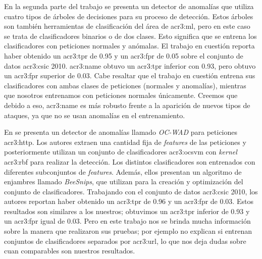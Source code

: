 En la segunda parte del trabajo
\citep{torranoGimenez2015study} %
se presenta un detector de anomalías que utiliza cuatro tipos de árboles
de decisiones para su proceso de detección. Estos árboles son también
herramientas de clasificación del área de \gls{acr3:ml}, pero en este
caso se trata de clasificadores binarios o de dos clases. Esto significa
que se entrena los clasificadores con peticiones normales y anómalas.
El trabajo en cuestión reporta haber obtenido un \gls{acr3:tpr} de \num{0.95}
y un \gls{acr3:fpr} de \num{0.05} sobre el conjunto de datos \gls{acr3:csic}
2010. \gls{acr3:name} obtuvo un \gls{acr3:tpr} inferior con \num{0.93},
pero obtuvo un \gls{acr3:fpr} superior de \num{0.03}.
Cabe resaltar que el trabajo en cuestión entrena sus clasificadores con
ambas clases de peticiones (normales y anomalías), mientras que nosotros
entrenamos con peticiones normales únicamente. Creemos que debido a eso,
\gls{acr3:name} es más robusto frente a la aparición de nuevos tipos de
ataques, ya que no se usan anomalías en el entrenamiento.

En \citep{parhizkar2015oc} %
se presenta un detector de anomalías llamado \textit{OC-WAD} para peticiones
\gls{acr3:http}. Los autores extraen una cantidad fija de \textit{features}
de las peticiones y posteriormente utilizan un conjunto de clasificadores
\gls{acr3:ocsvm} con \textit{kernel} \gls{acr3:rbf} para realizar la
detección. Los distintos clasificadores son entrenados con diferentes
subconjuntos de \textit{features}. Además, ellos presentan un algoritmo
de enjambres llamado \textit{BeeSnips}, que utilizan para la creación
y optimización del conjunto de clasificadores.
Trabajando con el conjunto de datos \gls{acr3:csic} 2010, los autores
reportan haber obtenido un \gls{acr3:tpr} de \num{0.96} y un \gls{acr3:fpr}
de \num{0.03}. Estos resultados son similares a los nuestros; obtuvimos
un \gls{acr3:tpr} inferior de \num{0.93} y un \gls{acr3:fpr} igual de
\num{0.03}. Pero en este trabajo nos se brinda mucha información sobre
la manera que realizaron sus pruebas; por ejemplo no explican si entrenan
conjuntos de clasificadores separados por \gls{acr3:url}, lo que nos
deja dudas sobre cuan comparables son nuestros resultados.
